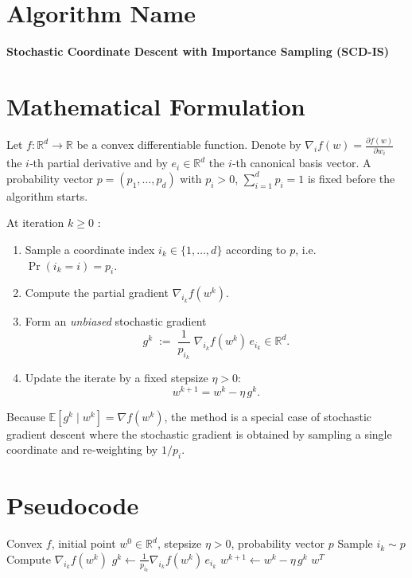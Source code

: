 \documentclass{article}
\begin{document}
\section*{Algorithm Name}
\textbf{Stochastic Coordinate Descent with Importance Sampling (SCD-IS)}

\section*{Mathematical Formulation}
Let $f:\mathbb{R}^d\rightarrow\mathbb{R}$ be a convex differentiable function.
Denote by $\nabla_i f(w)=\frac{\partial f(w)}{\partial w_i}$ the $i$‑th partial derivative and by $e_i\in\mathbb{R}^d$ the $i$‑th canonical basis vector.
A probability vector $p=(p_1,\dots ,p_d)$ with $p_i>0$, $\sum_{i=1}^d p_i=1$ is fixed before the algorithm starts.

At iteration $k\ge 0$ :

\begin{enumerate}[label=(\roman*)]
\item Sample a coordinate index $i_k\in\{1,\dots ,d\}$ according to $p$,
      i.e. $\Pr(i_k=i)=p_i$.
\item Compute the partial gradient $\nabla_{i_k}f(w^{k})$.
\item Form an \emph{unbiased} stochastic gradient
\[
g^{k}\;:=\;\frac{1}{p_{i_k}}\;\nabla_{i_k}f(w^{k})\,e_{i_k}\in\mathbb{R}^d .
\tag{1}
\]
\item Update the iterate by a fixed stepsize $\eta>0$:
\[
w^{k+1}=w^{k}-\eta\,g^{k}.
\tag{2}
\]
\end{enumerate}

Because $\mathbb{E}[g^{k}\mid w^{k}]=\nabla f(w^{k})$, the method is a special case of stochastic gradient descent where the stochastic gradient is obtained by sampling a single coordinate and re‑weighting by $1/p_i$.

\section*{Pseudocode}
\begin{algorithm}[H]
\caption{Stochastic Coordinate Descent with Importance Sampling}
\begin{algorithmic}[1]
\Require Convex $f$, initial point $w^{0}\in\mathbb{R}^{d}$, stepsize $\eta>0$, probability vector $p$
    \State Sample $i_k\sim p$   
    \State Compute $\nabla_{i_k}f(w^{k})$
    \State $g^{k}\gets \frac{1}{p_{i_k}}\nabla_{i_k}f(w^{k})\,e_{i_k}$   
    \State $w^{k+1}\gets w^{k}-\eta\,g^{k}$
\EndFor
\State \Return $w^{T}$
\end{algorithmic}
\end{algorithm}
\end{document}
